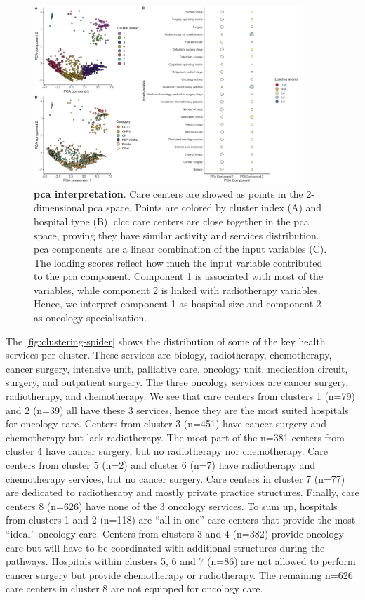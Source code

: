 \begin{figure}[h!]
    \includegraphics[width=0.9\textwidth]{images/camion/supplemental/sup_fig1_pca_and_clustering.png}
    \centering
    \caption{ \textbf{\ac{pca} interpretation}. Care centers are showed as
        points in the 2-dimensional \ac{pca} space. Points are colored by
        cluster index (A) and hospital type (B). \ac{clcc} care centers are
        close together in the \ac{pca} space, proving they have similar activity
        and services distribution. \ac{pca} components are a linear combination
        of the input variables (C). The loading scores reflect how much the
        input variable contributed to the \ac{pca} component. Component 1 is
        associated with most of the variables, while component 2 is linked with
        radiotherapy variables. Hence, we interpret component 1 as hospital size
        and component 2 as oncology specialization. }
    \label{fig:clustering-pca}
\end{figure}

The \cref{fig:clustering-spider} shows the distribution of some of the key
health services per cluster. These services are biology, radiotherapy,
chemotherapy, cancer surgery, intensive unit, palliative care, oncology unit,
medication circuit, surgery, and outpatient surgery. The three oncology services
are cancer surgery, radiotherapy, and chemotherapy. We see that care centers
from clusters 1 (n=79) and 2 (n=39) all have these 3 services, hence they are
the most suited hospitals for oncology care. Centers from cluster 3 (n=451) have
cancer surgery and chemotherapy but lack radiotherapy. The most part of the
n=381 centers from cluster 4 have cancer surgery, but no radiotherapy nor
chemotherapy. Care centers from cluster 5 (n=2) and cluster 6 (n=7) have
radiotherapy and chemotherapy services, but no cancer surgery. Care centers in
cluster 7 (n=77) are dedicated to radiotherapy and mostly private practice
structures. Finally, care centers 8 (n=626) have none of the 3 oncology
services. To sum up, hospitals from clusters 1 and 2 (n=118) are “all-in-one”
care centers that provide the most “ideal” oncology care. Centers from clusters
3 and 4 (n=382) provide oncology care but will have to be coordinated with
additional structures during the pathways. Hospitals within clusters 5, 6 and 7
(n=86) are not allowed to perform cancer surgery but provide chemotherapy or
radiotherapy. The remaining n=626 care centers in cluster 8 are not equipped for
oncology care.

